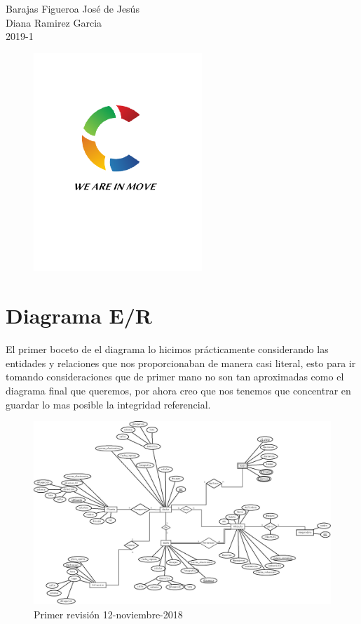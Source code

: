 \documentclass{article}
\begin{document}
\begin{titlepage}
\begin{center}
\begin{center}
Barajas Figueroa José de Jesús\\
Diana Ramirez Garcia\\
\vspace*{.3in}
2019-1 \\%
\begin{figure}[H]
\begin{center}
\includegraphics[width=2.5in]{./img/logo.png}
\end{center}
\end{figure}

    
\end{center}
\end{center}
\end{titlepage}
\section{Diagrama E/R}

El primer boceto de el diagrama lo hicimos prácticamente considerando las entidades y relaciones que nos proporcionaban de manera casi literal, esto para ir tomando consideraciones que de primer mano no son tan aproximadas como el diagrama final que queremos, por ahora creo que nos tenemos que concentrar en guardar lo mas posible la integridad referencial.\\ 
\begin{figure}[H]
\begin{center}
\includegraphics[width=5in]{./img/R_boceto1.jpeg}
\caption{Primer revisión 12-noviembre-2018}
\end{center}
\end{figure}
\end{document}
